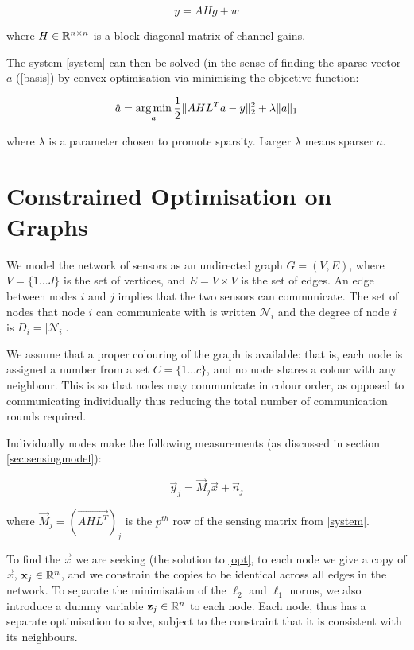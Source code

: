 \begin{equation}
y = AHg + w
\label{system}
\end{equation}

where \(H \in {\mathbb{R}}^{n \times n}\) is a block diagonal matrix of channel gains.

The system  \ref{system} can then be solved (in the sense of finding the sparse vector \(a\) (\ref{basis}) by convex optimisation via minimising the objective function:

\begin{equation}
\hat{a} = \operatorname*{arg\,min}_{a} \frac{1}{2}\|AHL^{T}a-y\|_2^2 + \lambda \|a\|_1
\label{opt}
\end{equation}

where \(\lambda\) is a parameter chosen to promote sparsity. Larger \(\lambda\) means sparser \(a\).

\section{Constrained Optimisation on Graphs}\label{sec:opt-on-graphs}

We model the network of sensors as an undirected graph \(G = \left(V,E\right)\), where \(V = \{1 \ldots J\}\) is the set of vertices, and \(E = V \times V\) is the set of edges. An edge between nodes \(i\) and \(j\) implies that the two sensors can communicate. The set of nodes that node \(i\) can communicate with is written \(\mathcal{N}_i\) and the degree of node \(i\) is \(D_i = |\mathcal{N}_i|\). 

We assume that a proper colouring of the graph is available: that is, each node is assigned a number from a set \(C = \{1 \ldots c \} \), and no node shares a colour with any neighbour. This is so that nodes may communicate in colour order, as opposed to communicating individually thus reducing the total number of communication rounds required. 

Individually nodes make the following measurements (as discussed in section \ref{sec:sensingmodel}):

\begin{equation}
\vec{y}_j = \vec{M}_j\vec{x} + \vec{n}_j
\end{equation}

where \(\vec{M}_j = \left(\vec{AHL^T}\right)_j \) is the \(p^{th} \) row of the sensing matrix from \eqref{system}.

To find the \(\vec{x}\) we are seeking (the solution to \eqref{opt}, to each node we give a copy of \(\vec{x}\), \(\mathbf{x}_j \in {\mathbb{R}}^n\), and we constrain the copies to be identical across all edges in the network. To separate the minimisation of the \(\ell_2\) and \(\ell_1\) norms, we also introduce a dummy variable \(\mathbf{z}_j \in {\mathbb{R}}^n\) to each node. Each node, thus has a separate optimisation to solve, subject to the constraint that it is consistent with its neighbours.

